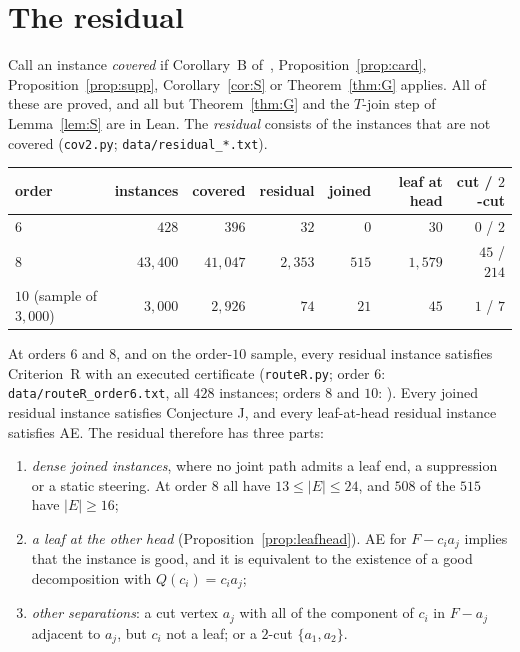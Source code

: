 \documentclass[11pt]{amsart}
\theoremstyle{definition}
\begin{document}
\section{The residual}\label{sec:resid}

Call an instance \emph{covered} if Corollary~B of~\cite{LN}, Proposition~\ref{prop:card},
Proposition~\ref{prop:supp}, Corollary~\ref{cor:S} or Theorem~\ref{thm:G} applies. All of these are proved, and all
but Theorem~\ref{thm:G} and the $T$-join step of Lemma~\ref{lem:S} are in Lean. The \emph{residual}
consists of the instances that are not covered (\texttt{cov2.py}; \texttt{data/residual\_*.txt}).
\begin{center}\footnotesize
\begin{tabular}{@{}lrrrrrr@{}}
\toprule
order & instances & covered & residual & joined & leaf at head & cut / $2$-cut\\
\midrule
$6$ & $428$ & $396$ & $32$ & $0$ & $30$ & $0$ / $2$\\
$8$ & $43{,}400$ & $41{,}047$ & $2{,}353$ & $515$ & $1{,}579$ & $45$ / $214$\\
$10$ (sample of $3{,}000$) & $3{,}000$ & $2{,}926$ & $74$ & $21$ & $45$ & $1$ / $7$\\
\bottomrule
\end{tabular}
\end{center}
At orders $6$ and $8$, and on the order-$10$ sample, every residual instance satisfies Criterion~R
with an executed certificate (\texttt{routeR.py}; order $6$: \texttt{data/routeR\_order6.txt}, all
$428$ instances; orders $8$ and $10$: \cite{LN}). Every joined residual instance
satisfies Conjecture J, and every leaf-at-head residual instance satisfies AE. The residual
therefore has three parts:
\begin{enumerate}[label=(R\arabic*)]
\item \emph{dense joined instances}, where no joint path admits a leaf end, a suppression or a static
steering. At order $8$ all have $13\le|E|\le24$, and $508$ of the $515$ have $|E|\ge16$;
\item \emph{a leaf at the other head} (Proposition~\ref{prop:leafhead}). AE for $F-c_ia_j$ implies that the
instance is good, and it is equivalent to the existence of a good decomposition with $Q(c_i)=c_ia_j$;
\item \emph{other separations}: a cut vertex $a_j$ with all of the component of $c_i$ in $F-a_j$ adjacent to $a_j$, but $c_i$ not a leaf; or a
$2$-cut $\{a_1,a_2\}$.
\end{enumerate}
\end{document}
